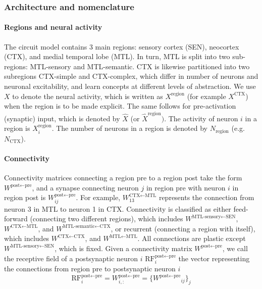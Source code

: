 \documentclass{article}
\begin{document}
\subsubsection*{Architecture and nomenclature}
\paragraph*{Regions and neural activity}
The circuit model contains 3 main regions: sensory cortex (SEN), neocortex (CTX), and medial temporal lobe (MTL). In turn, MTL is split into two sub-regions: MTL-sensory and MTL-semantic. CTX is likewise partitioned into two subregions CTX-simple and CTX-complex, which differ in number of neurons and neuronal excitability, and learn concepts at different levels of abstraction. We use $X$ to denote the neural activity, which is written as $X^\textrm{region}$ (for example $X^\textrm{CTX}$) when the region is to be made explicit. The same follows for pre-activation (synaptic) input, which is denoted by $\hat{X}$ (or $\hat{X}^\textrm{region})$. The activity of neuron $i$ in a region is $X^\textrm{region}_i$. The number of neurons in a region is denoted by $N_\textrm{region}$ (e.g. $N_\textrm{CTX}$).
\paragraph{Connectivity}
Connectivity matrices connecting a region \textrm{pre} to a region \textrm{post} take the form $W^{\textrm{post}\leftarrow\textrm{pre}}$, and a synapse connecting neuron $j$ in region pre with neuron $i$ in region post is $W^{\textrm{post}\leftarrow\textrm{pre}}_{ij}$. For example, $W^{\textrm{CTX}\leftarrow\textrm{MTL}}_{13}$ represents the connection from neuron 3 in MTL to neuron 1 in CTX. Connectivity is classified as either feed-forward (connecting two different regions), which includes  $W^{\textrm{MTL-sensory}\leftarrow\textrm{SEN}}$, $W^{\textrm{CTX}\leftarrow\textrm{MTL}}$, and $W^{\textrm{MTL-semantic}\leftarrow\textrm{CTX}}$, or recurrent (connecting a region with itself), which includes $W^{\textrm{CTX}\leftarrow\textrm{CTX}}$, and $W^{\textrm{MTL}\leftarrow\textrm{MTL}}$. All connections are plastic except $W^{\textrm{MTL-sensory}\leftarrow\textrm{SEN}}$, which is fixed. Given a connectivity matrix $W^{\textrm{post}\leftarrow\textrm{pre}}$, we call the receptive field of a postsynaptic neuron $i$ $\textrm{RF}^{\textrm{post}\leftarrow\textrm{pre}}_i$ the vector representing the connections from region pre to postsynaptic neuron $i$
\begin{equation}
    \textrm{RF}^{\textrm{post}\leftarrow\textrm{pre}}_i =  W^{\textrm{post}\leftarrow\textrm{pre}}_{i,:} = \{{W^{\textrm{post}\leftarrow\textrm{pre}}}_{ij}\}_j 
\end{equation}
\end{document}
